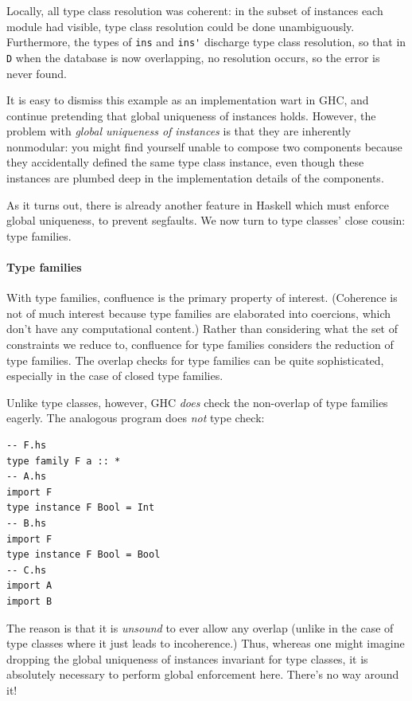 \documentclass{article}
\begin{document}
Locally, all type class resolution was coherent: in the subset of
instances each module had visible, type class resolution could be done
unambiguously.  Furthermore, the types of \verb|ins| and \verb|ins'|
discharge type class resolution, so that in \verb|D| when the database
is now overlapping, no resolution occurs, so the error is never found.

It is easy to dismiss this example as an implementation wart in GHC, and
continue pretending that global uniqueness of instances holds.  However,
the problem with \emph{global uniqueness of instances} is that they are
inherently nonmodular: you might find yourself unable to compose two
components because they accidentally defined the same type class
instance, even though these instances are plumbed deep in the
implementation details of the components.

As it turns out, there is already another feature in Haskell which
must enforce global uniqueness, to prevent segfaults.
We now turn to type classes' close cousin: type families.

\paragraph{Type families}  With type families, confluence is the primary
property of interest.  (Coherence is not of much interest because type
families are elaborated into coercions, which don't have any
computational content.)  Rather than considering what the set of
constraints we reduce to, confluence for type families considers the
reduction of type families.  The overlap checks for type families
can be quite sophisticated, especially in the case of closed type
families.

Unlike type classes, however, GHC \emph{does} check the non-overlap
of type families eagerly.  The analogous program does \emph{not} type check:

\begin{verbatim}
-- F.hs
type family F a :: *
-- A.hs
import F
type instance F Bool = Int
-- B.hs
import F
type instance F Bool = Bool
-- C.hs
import A
import B
\end{verbatim}

The reason is that it is \emph{unsound} to ever allow any overlap
(unlike in the case of type classes where it just leads to incoherence.)
Thus, whereas one might imagine dropping the global uniqueness of instances
invariant for type classes, it is absolutely necessary to perform global
enforcement here.  There's no way around it!
\end{document}
